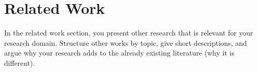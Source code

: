 \setchaptertoc
\chapter{Related Work}\label{chp:related-work}
\begin{summary}
   In the related work section, you present other research that is relevant for your research domain.
   Structure other works by topic, give short descriptions, and argue why your research adds to the already existing literature (why it is different).
\end{summary}



